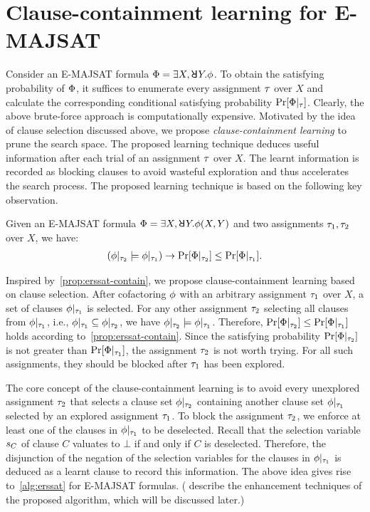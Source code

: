 \section{Clause-containment learning for E-MAJSAT}
\label{sect:erssat-technique}

Consider an E-MAJSAT formula $\Qf = \exists X,\random{} Y.\pf$.
To obtain the satisfying probability of $\Phi$,
it suffices to enumerate every assignment $\tau$ over $X$ and calculate the corresponding conditional satisfying probability $\Pr[\Phi|_{\tau}]$.
Clearly, the above brute-force approach is computationally expensive.
Motivated by the idea of clause selection discussed above,
we propose \textit{clause-containment learning} to prune the search space.
The proposed learning technique deduces useful information after each trial of an assignment $\tau$ over $X$.
The learnt information is recorded as blocking clauses to avoid wasteful exploration and thus accelerates the search process.
The proposed learning technique is based on the following key observation.

\begin{proposition}
    \label{prop:erssat-contain}
    Given an E-MAJSAT formula $\Qf=\exists X,\random{} Y.\pf(X,Y)$ and two assignments $\tau_1,\tau_2$ over $X$,
    we have:
    \begin{align*}
        (\phi|_{\tau_2}\models\phi|_{\tau_1})\rightarrow\Pr[\Phi|_{\tau_2}]\leq\Pr[\Phi|_{\tau_1}].
    \end{align*}
\end{proposition}

Inspired by~\cref{prop:erssat-contain},
we propose clause-containment learning based on clause selection.
After cofactoring $\phi$ with an arbitrary assignment $\tau_1$ over $X$,
a set of clauses $\phi|_{\tau_1}$ is selected.
For any other assignment $\tau_2$ selecting all clauses from $\phi|_{\tau_1}$,
i.e., $\phi|_{\tau_1}\subseteq\phi|_{\tau_2}$,
we have $\phi|_{\tau_2} \models \phi|_{\tau_1}$.
Therefore, $\Pr[\Phi|_{\tau_2}]\leq\Pr[\Phi|_{\tau_1}]$ holds according to~\cref{prop:erssat-contain}.
Since the satisfying probability $\Pr[\Phi|_{\tau_2}]$ is not greater than $\Pr[\Phi|_{\tau_1}]$,
the assignment $\tau_2$ is not worth trying.
For all such assignments,
they should be blocked after $\tau_1$ has been explored.

The core concept of the clause-containment learning is to avoid every unexplored assignment $\tau_2$ that selects a clause set $\phi|_{\tau_2}$ containing another clause set $\phi|_{\tau_1}$ selected by an explored assignment $\tau_1$.
To block the assignment $\tau_2$,
we enforce at least one of the clauses in $\phi|_{\tau_1}$ to be deselected.
Recall that the selection variable $s_{C}$ of clause $C$ valuates to $\bot$ if and only if $C$ is deselected.
Therefore, the disjunction of the negation of the selection variables for the clauses in $\phi|_{\tau_1}$ is deduced as a learnt clause to record this information.
The above idea gives rise to~\cref{alg:erssat} for E-MAJSAT formulas.
( describe the enhancement techniques of the proposed algorithm, which will be discussed later.)

